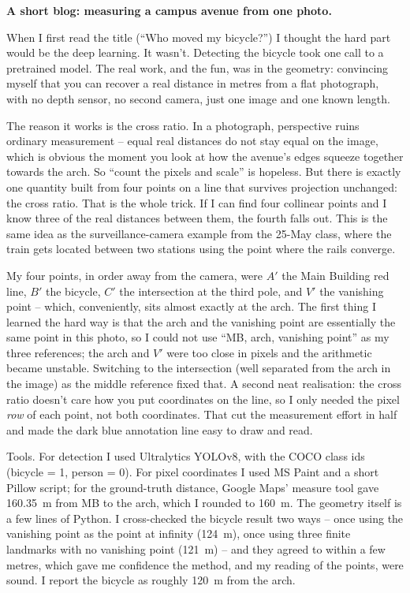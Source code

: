 \begin{studentSpace}
\noindent\textbf{A short blog: measuring a campus avenue from one photo.}

When I first read the title (``Who moved my bicycle?'') I thought the
hard part would be the deep learning. It wasn't. Detecting the bicycle
took one call to a pretrained model. The real work, and the fun, was in
the geometry: convincing myself that you can recover a real distance in
metres from a flat photograph, with no depth sensor, no second camera,
just one image and one known length.

The reason it works is the cross ratio. In a photograph, perspective
ruins ordinary measurement -- equal real distances do not stay equal on
the image, which is obvious the moment you look at how the avenue's edges
squeeze together towards the arch. So ``count the pixels and scale'' is
hopeless. But there is exactly one quantity built from four points on a
line that survives projection unchanged: the cross ratio. That is the
whole trick. If I can find four collinear points and I know three of the
real distances between them, the fourth falls out. This is the same idea
as the surveillance-camera example from the 25-May class, where the train
gets located between two stations using the point where the rails
converge.

My four points, in order away from the camera, were $A'$ the Main
Building red line, $B'$ the bicycle, $C'$ the intersection at the third
pole, and $V'$ the vanishing point -- which, conveniently, sits almost
exactly at the arch. The first thing I learned the hard way is that the
arch and the vanishing point are essentially the same point in this
photo, so I could not use ``MB, arch, vanishing point'' as my three
references; the arch and $V'$ were too close in pixels and the arithmetic
became unstable. Switching to the intersection (well separated from the
arch in the image) as the middle reference fixed that. A second neat
realisation: the cross ratio doesn't care how you put coordinates on the
line, so I only needed the pixel \emph{row} of each point, not both
coordinates. That cut the measurement effort in half and made the dark
blue annotation line easy to draw and read.

Tools. For detection I used Ultralytics YOLOv8, with the COCO class ids
(bicycle = 1, person = 0). For pixel coordinates I used MS Paint and a
short Pillow script; for the ground-truth distance, Google Maps' measure
tool gave 160.35~m from MB to the arch, which I rounded to 160~m. The
geometry itself is a few lines of Python. I cross-checked the bicycle
result two ways -- once using the vanishing point as the point at
infinity (124~m), once using three finite landmarks with no vanishing
point (121~m) -- and they agreed to within a few metres, which gave me
confidence the method, and my reading of the points, were sound. I report
the bicycle as roughly 120~m from the arch.


\end{studentSpace}
